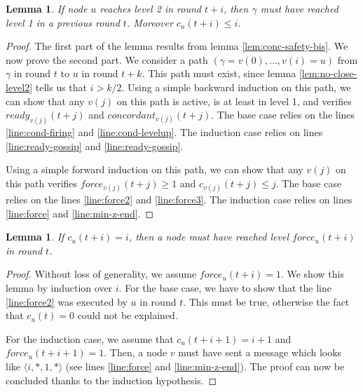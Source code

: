 \documentclass[11pt,letterpaper]{article}
\renewcommand{\leq}{\leqslant}
\renewcommand{\geq}{\geqslant}
\newtheorem{lem}[thm]{Lemma}
\newcommand{\cent}{\gamma}
\begin{document}
\begin{lem} \label{lem:ready-safety}
	If node $u$ reaches level 2 in round $t+i$, then $\cent$ must have reached level 1 in a previous round $t$. Moreover $c_u(t+i) \leq i$.
\end{lem}
\begin{proof}
	The first part of the lemma results from lemma \ref{lem:conc-safety-bis}. We now prove the second part.
	We consider a path $(\cent = v(0), \dots, v(i) = u)$ from $\cent$ in round $t$ to $u$ in round $t+k$. This path must exist, since lemma \ref{lem:no-close-level2} tells us that $i > k/2$.
	Using a simple backward induction on this path, we can show that any $v(j)$ on this path is active, is at least in level 1, and verifies $ready_{v(j)}(t+j)$ and $concordant_{v(j)}(t+j)$.
	The base case relies on the lines \ref{line:cond-firing} and \ref{line:cond-levelup}. The induction case relies on lines \ref{line:ready-gossip} and \ref{line:ready-gossip}.

	Using a simple forward induction on this path, we can show that any $v(j)$ on this path verifies $force_{v(j)}(t+j) \geq 1$ and $c_{v(j)}(t+j) \leq j$.
	The base case relies on the lines \ref{line:force2} and \ref{line:force3}. The induction case relies on lines \ref{line:force} and \ref{line:min-z-end}.
\end{proof}

\begin{lem} \label{lem:safety-force}
	If $c_u(t+i) = i$, then a node must have reached level $force_u(t+i)$ in round $t$.
\end{lem}
\begin{proof}
	Without loss of generality, we assume $force_u(t+i) = 1$.
	We show this lemma by induction over $i$.
	For the base case, we have to show that the line \ref{line:force2} was executed by $u$ in round $t$.
	This must be true, otherwise the fact that $c_u(t) = 0$ could not be explained.

	For the induction case, we assume that $c_u(t+i+1) = i+1$ and $force_u(t+i+1) = 1$.
	Then, a node $v$ must have sent a message which looks like $\langle i, *, 1, * \rangle$ (see lines \ref{line:force} and \ref{line:min-z-end}).
	The proof can now be concluded thanks to the induction hypothesis.
\end{proof}
\end{document}
